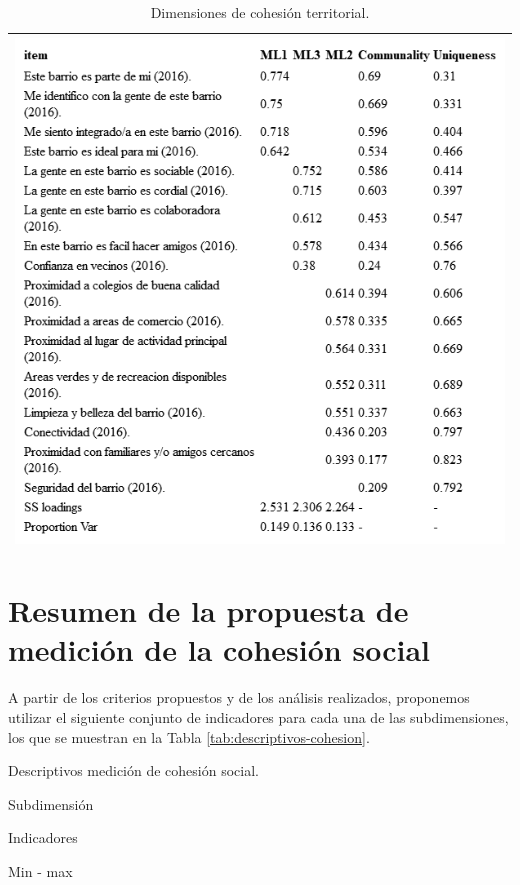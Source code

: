 \documentclass[
  12pt,
]{book}
\begin{document}
\begin{longtable}[]{@{}l@{}}
\caption{\label{tab:cohesion-territorial-fa}Dimensiones de cohesión territorial.}\tabularnewline
\toprule
\endhead
\includegraphics[width=8.33333in,height=\textheight]{output/tables/cohesion_territorial_fa.png}\tabularnewline
\bottomrule
\end{longtable}

\hypertarget{resumen-de-la-propuesta-de-mediciuxf3n-de-la-cohesiuxf3n-social}{%
\section{Resumen de la propuesta de medición de la cohesión social}\label{resumen-de-la-propuesta-de-mediciuxf3n-de-la-cohesiuxf3n-social}}

A partir de los criterios propuestos y de los análisis realizados, proponemos utilizar el siguiente conjunto de indicadores para cada una de las subdimensiones, los que se muestran en la Tabla \ref{tab:descriptivos-cohesion}.

\label{tab:descriptivos-cohesion}Descriptivos medición de cohesión social.

Subdimensión

Indicadores

Min - max
\end{document}
